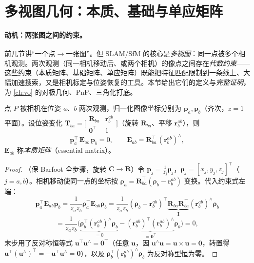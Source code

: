 \section{多视图几何：本质、基础与单应矩阵}
\label{sec:cam-epipolar}

\paragraph{动机：两张图之间的约束。}
前几节讲“一个点$\to$一张图”。但 SLAM/SfM 的核心是\emph{多视图}：同一点被多个相机观测。两次观测（同一相机移动后、或两个相机）的像点之间存在\emph{代数约束}\cite{barfoot2024state}——这些约束（本质矩阵、基础矩阵、单应矩阵）既能把特征匹配限制到一条线上、大幅加速搜索，又是相机标定与位姿恢复的工具。本节给出它们的定义与\emph{完整证明}，为 \cref{ch:vo} 的对极几何、PnP、三角化打底。

\begin{theorem}[本质矩阵与对极约束]\label{thm:essential}
点 $P$ 被相机在位姿 $a$、$b$ 两次观测，归一化图像坐标分别为 $\mathbf{p}_a,\mathbf{p}_b$（齐次，$z=1$ 平面）。设位姿变化 $\mathbf{T}_{ba}=\big[\begin{smallmatrix}\mathbf{R}_{ba}&\mathbf{r}_b^{ab}\\\mathbf{0}^\top&1\end{smallmatrix}\big]$（旋转 $\mathbf{R}_{ba}$、平移 $\mathbf{r}_b^{ab}$），则
\begin{equation}
  \mathbf{p}_a^\top\,\mathbf{E}_{ab}\,\mathbf{p}_b=0,\qquad
  \mathbf{E}_{ab}=\mathbf{R}_{ba}^\top\,(\mathbf{r}_b^{ab})^\wedge,
  \label{eq:essential}
\end{equation}
$\mathbf{E}_{ab}$ 称\emph{本质矩阵}（essential matrix）。
\end{theorem}
\begin{proof}
（保 Barfoot 全步骤，旋转 $\mathbf{C}\to\mathbf{R}$\cite{barfoot2024state}）令 $\mathbf{p}_j=\tfrac1{z_j}\boldsymbol\rho_j$，$\boldsymbol\rho_j=[x_j,y_j,z_j]^\top$（$j=a,b$）。相机移动使同一点的坐标按 $\boldsymbol\rho_a=\mathbf{R}_{ba}^\top(\boldsymbol\rho_b-\mathbf{r}_b^{ab})$ 变换。代入约束式左端：
\[
  \mathbf{p}_a^\top\mathbf{E}_{ab}\mathbf{p}_b
  =\frac1{z_az_b}\boldsymbol\rho_a^\top\mathbf{E}_{ab}\boldsymbol\rho_b
  =\frac1{z_az_b}(\boldsymbol\rho_b-\mathbf{r}_b^{ab})^\top
  \underbrace{\mathbf{R}_{ba}\mathbf{R}_{ba}^\top}_{\mathbf{I}}(\mathbf{r}_b^{ab})^\wedge\boldsymbol\rho_b
\]
\[
  =\frac1{z_az_b}\Big(\underbrace{\boldsymbol\rho_b^\top(\mathbf{r}_b^{ab})^\wedge\boldsymbol\rho_b}_{=0}
  -\underbrace{(\mathbf{r}_b^{ab})^\top(\mathbf{r}_b^{ab})^\wedge}_{=\mathbf{0}^\top}\boldsymbol\rho_b\Big)=0,
\]
末步用了反对称恒等式 $\mathbf{u}^\top\mathbf{u}^\wedge=\mathbf{0}^\top$（任意 $\mathbf{u}$，因 $\mathbf{u}^\wedge\mathbf{u}=\mathbf{u}\times\mathbf{u}=\mathbf{0}$，转置得 $\mathbf{u}^\top(\mathbf{u}^\wedge)^\top=-\mathbf{u}^\top\mathbf{u}^\wedge=\mathbf{0}$），以及 $\boldsymbol\rho_b^\top(\mathbf{r}_b^{ab})^\wedge\boldsymbol\rho_b$ 为反对称型恒为零。
\end{proof}


